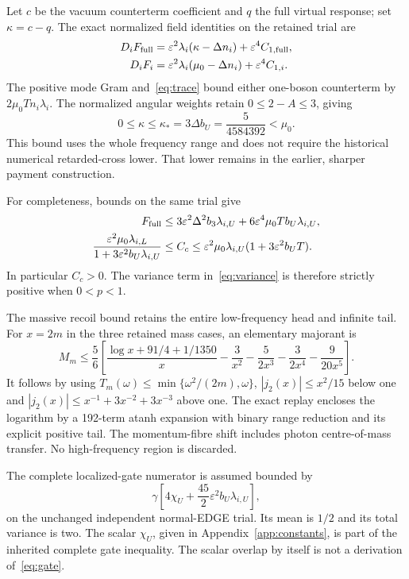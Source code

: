 \documentclass[11pt]{article}
\theoremstyle{definition}
\newcommand{\eps}{\varepsilon}
\begin{document}
Let $c$ be the vacuum counterterm coefficient and $q$ the full virtual response; set $\kappa=c-q$. The exact normalized field identities on the retained trial are
\begin{align}\label{eq:exactfield}
 D_iF_{\rm full}&=\eps^2\lambda_i(\kappa-\Delta n_i)+\eps^4 C_{1,\rm full},\notag\\
 D_iF_i&=\eps^2\lambda_i(\mu_0-\Delta n_i)+\eps^4 C_{1,i}.
\end{align}
The positive mode Gram and~\eqref{eq:trace} bound either one-boson counterterm by $2\mu_0Tn_i\lambda_i$. The normalized angular weights retain $0\leq2-A\leq3$, giving
\begin{equation}\label{eq:kappastar}
 0\leq\kappa\leq\kappa_*=3\Delta b_U=\frac5{4584392}<\mu_0.
\end{equation}
This bound uses the whole frequency range and does not require the historical numerical retarded-cross lower. That lower remains in the earlier, sharper payment construction.

For completeness, bounds on the same trial give
\begin{align}\label{eq:separatefield}
 F_{\rm full}&\leq3\eps^2\Delta^2b_3\lambda_{i,U}
                 +6\eps^4\mu_0Tb_U\lambda_{i,U},\notag\\
 \frac{\eps^2\mu_0\lambda_{i,L}}{1+3\eps^2b_U\lambda_{i,U}}
 &\leq C_c\leq\eps^2\mu_0\lambda_{i,U}(1+3\eps^2b_UT).
\end{align}
In particular $C_c>0$. The variance term in~\eqref{eq:variance} is therefore strictly positive when $0<p<1$.

The massive recoil bound retains the entire low-frequency head and infinite tail. For $x=2m$ in the three retained mass cases, an elementary majorant is
\begin{equation}\label{eq:massive}
 M_m\leq\frac56\left[
 \frac{\log x+91/4+1/1350}{x}-\frac3{x^2}-\frac5{2x^3}
 -\frac3{2x^4}-\frac9{20x^5}\right].
\end{equation}
It follows by using $T_m(\omega)\leq\min\{\omega^2/(2m),\omega\}$, $|j_2(x)|\leq x^2/15$ below one and $|j_2(x)|\leq x^{-1}+3x^{-2}+3x^{-3}$ above one. The exact replay encloses the logarithm by a 192-term atanh expansion with binary range reduction and its explicit positive tail. The momentum-fibre shift includes photon centre-of-mass transfer. No high-frequency region is discarded.

The complete localized-gate numerator is assumed bounded by
\begin{equation}\label{eq:gate}
 \gamma\left[4\chi_U+\frac{45}{2}\eps^2b_U\lambda_{i,U}\right],
\end{equation}
on the unchanged independent normal-EDGE trial. Its mean is $1/2$ and its total variance is two. The scalar $\chi_U$, given in Appendix~\ref{app:constants}, is part of the inherited complete gate inequality. The scalar overlap by itself is not a derivation of~\eqref{eq:gate}.
\end{document}
